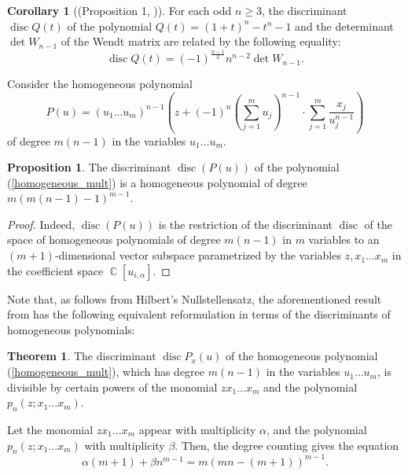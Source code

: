 \documentclass[14pt, dvipsnames]{extarticle}
\theoremstyle{definition}
\newtheorem{theorem}{Theorem}
\newtheorem{coroll}{Corollary}[theorem]
\newtheorem{prop}{Proposition}
\theoremstyle{definition}
\theoremstyle{remark}
\DeclareMathOperator{\Cc}{\mathbb{C}}
\DeclareMathOperator{\disc}{\mathrm{disc}}
\begin{document}
\begin{coroll}[(Proposition 1, \cite{Helou})]
For each odd $n\geqslant 3$, the discriminant $\disc Q(t)$ of the polynomial $Q(t) = (1 + t)^n - t^n - 1$ and the determinant $\det W_{n-1}$ of the Wendt matrix are related by the following equality:
$$\disc Q(t) = (-1)^{\frac{n-1}{2}}n^{n-2}\det W_{n-1}.$$
\end{coroll}

Consider the homogeneous polynomial
\begin{equation}\label{homogeneous_mult}
P(u) = (u_1 \dots u_m)^{n-1}\left(z + (-1)^n\left ( \sum\limits_{j=1}^m u_j \right )^{n-1}\cdot \sum\limits_{j=1}^m\frac{x_j}{u_j^{n-1}}\right)
\end{equation}
of degree $m(n-1)$ in the variables $u_1\dots u_m$.

\begin{prop}
The discriminant $\disc(P(u))$ of the polynomial (\ref{homogeneous_mult}) is a homogeneous polynomial of degree $m(m(n-1)-1)^{m-1}$.
\end{prop}

\begin{proof}
Indeed, $\disc(P(u))$ is the restriction of the discriminant $\disc$ of the space of homogeneous polynomials of degree $m(n-1)$ in $m$ variables to an $(m+1)$-dimensional vector subspace parametrized by the variables $z, x_1\dots x_m$ in the coefficient space $\Cc[u_{i, \alpha}]$.
\end{proof}

Note that, as follows from Hilbert's Nullstellensatz, the aforementioned result from \cite[Theorem 3.2]{Gaiur} has the following equivalent reformulation in terms of the discriminants of homogeneous polynomials:

\begin{theorem}\label{multi_disc}
The discriminant $\disc P_x(u)$ of the homogeneous polynomial (\ref{homogeneous_mult}), which has degree $m(n-1)$ in the variables $u_1\dots u_m$, is divisible by certain powers of the monomial $zx_1 \dots x_m$ and the polynomial $p_n(z; x_1\dots x_m)$.
\end{theorem}

Let the monomial $zx_1 \dots x_m$ appear with multiplicity $\alpha$, and the polynomial $p_n(z; x_1\dots x_m)$ with multiplicity $\beta$. Then, the degree counting gives the equation
\begin{equation}\label{discriminant_degree}
\alpha(m+1) + \beta n^{m-1} = m(mn - (m+1))^{m-1}.
\end{equation}
\end{document}
